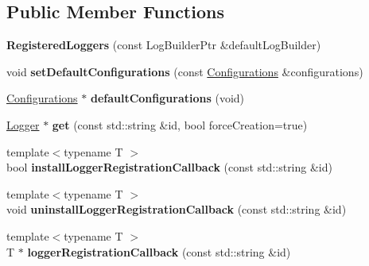 \subsection*{Public Member Functions}
\begin{DoxyCompactItemize}
\item 
\hypertarget{classel_1_1base_1_1RegisteredLoggers_ae52ec336770d33fef86f234e4e68dce5}{{\bfseries Registered\-Loggers} (const Log\-Builder\-Ptr \&default\-Log\-Builder)}\label{classel_1_1base_1_1RegisteredLoggers_ae52ec336770d33fef86f234e4e68dce5}

\item 
\hypertarget{classel_1_1base_1_1RegisteredLoggers_a28e1f955ad55d89a4ae91fa74545ee4f}{void {\bfseries set\-Default\-Configurations} (const \hyperlink{classel_1_1Configurations}{Configurations} \&configurations)}\label{classel_1_1base_1_1RegisteredLoggers_a28e1f955ad55d89a4ae91fa74545ee4f}

\item 
\hypertarget{classel_1_1base_1_1RegisteredLoggers_acb38f67cf5e297f4be3efa5312e09914}{\hyperlink{classel_1_1Configurations}{Configurations} $\ast$ {\bfseries default\-Configurations} (void)}\label{classel_1_1base_1_1RegisteredLoggers_acb38f67cf5e297f4be3efa5312e09914}

\item 
\hypertarget{classel_1_1base_1_1RegisteredLoggers_a8e554505cd7f66d31e91933b61d74144}{\hyperlink{classel_1_1Logger}{Logger} $\ast$ {\bfseries get} (const std\-::string \&id, bool force\-Creation=true)}\label{classel_1_1base_1_1RegisteredLoggers_a8e554505cd7f66d31e91933b61d74144}

\item 
\hypertarget{classel_1_1base_1_1RegisteredLoggers_a62000b4c52b2383ec7f480ee0fd12586}{{\footnotesize template$<$typename T $>$ }\\bool {\bfseries install\-Logger\-Registration\-Callback} (const std\-::string \&id)}\label{classel_1_1base_1_1RegisteredLoggers_a62000b4c52b2383ec7f480ee0fd12586}

\item 
\hypertarget{classel_1_1base_1_1RegisteredLoggers_ae72594329e082a58ba9e73462d6c5bb5}{{\footnotesize template$<$typename T $>$ }\\void {\bfseries uninstall\-Logger\-Registration\-Callback} (const std\-::string \&id)}\label{classel_1_1base_1_1RegisteredLoggers_ae72594329e082a58ba9e73462d6c5bb5}

\item 
\hypertarget{classel_1_1base_1_1RegisteredLoggers_ae65d8c76311c733f7191867e13ebbe99}{{\footnotesize template$<$typename T $>$ }\\T $\ast$ {\bfseries logger\-Registration\-Callback} (const std\-::string \&id)}\label{classel_1_1base_1_1RegisteredLoggers_ae65d8c76311c733f7191867e13ebbe99}


\end{DoxyCompactItemize}
